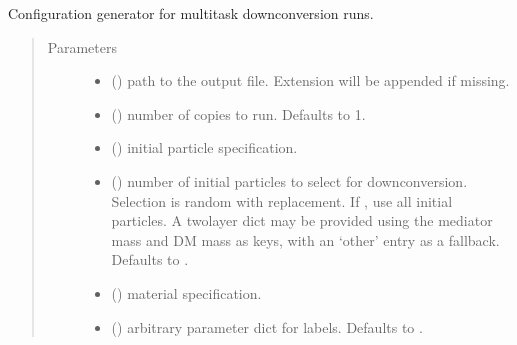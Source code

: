 \documentclass[letterpaper,10pt,english]{sphinxmanual}
\begin{document}
\begin{fulllineitems}
\label{\detokenize{interface:scdc.interface.Configuration}}
Configuration generator for multi\sphinxhyphen{}task downconversion runs.
\begin{quote}\begin{description}
\item[{Parameters}] \leavevmode\begin{itemize}
\item {} 
 () \textendash{} path to the output file. Extension will be appended
if missing.

\item {} 
 (\sphinxstyleliteralemphasis{\sphinxupquote{, }}) \textendash{} number of copies to run. Defaults to 1.

\item {} 
 () \textendash{} initial particle specification.

\item {} 
 (\sphinxstyleliteralemphasis{\sphinxupquote{, }}) \textendash{} number of initial particles to
select for downconversion. Selection is random with replacement. If
, use all initial particles. A two\sphinxhyphen{}layer dict may be
provided using the mediator mass and DM mass as keys, with an
‘other’ entry as a fallback. Defaults to .

\item {} 
 () \textendash{} material specification.

\item {} 
 (\sphinxstyleliteralemphasis{\sphinxupquote{, }}) \textendash{} arbitrary parameter dict for labels.
Defaults to \sphinxtitleref{\{\}}.


\end{itemize}
\end{description}
\end{quote}
\end{fulllineitems}
\end{document}
